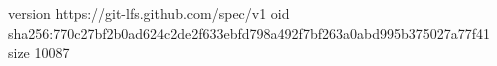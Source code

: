 version https://git-lfs.github.com/spec/v1
oid sha256:770c27bf2b0ad624c2de2f633ebfd798a492f7bf263a0abd995b375027a77f41
size 10087
